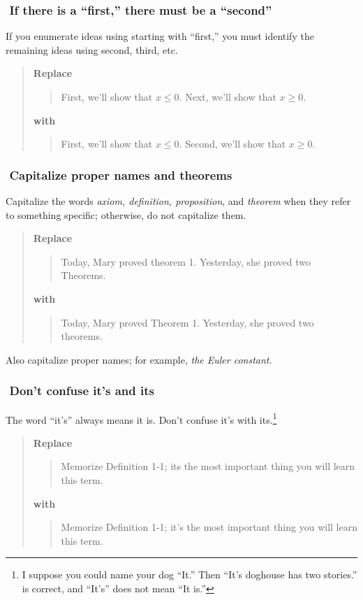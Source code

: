 \documentclass[12pt]{article}
\newcounter{ex}\setcounter{ex}{0}
\newcommand{\ex}{%
\hspace{-0.2in} \setcounter{ex}{\value{ex}+1}
\theex \,\,}
\newcounter{id}\setcounter{id}{0}
\newcounter{se}\setcounter{se}{0}
\begin{document}
\subsubsection*{\ex If there is a ``first,'' there must be a ``second''}

If you enumerate ideas using starting with ``first,'' you must identify
the remaining ideas using second, third, etc.

\begin{quote}
\textbf{\textbf{Replace}}
\begin{quote}
First, we'll show that \(x \leq 0\). Next, we'll show that
\(x \geq 0\).
\end{quote}
\textbf{with}
\begin{quote}
First, we'll show that \(x \leq 0\).  Second, we'll show that
\mbox{\(x \geq 0\)}.
\end{quote}
\end{quote}



\subsubsection*{\ex  Capitalize proper names and theorems}

Capitalize the words {\em axiom, definition, proposition\/}, and {\em theorem\/}
when they refer to something specific; otherwise, do not
capitalize them.

\begin{quote}
\textbf{\textbf{Replace}}
\begin{quote}
Today, Mary proved theorem 1. Yesterday, she proved two Theorems.
\end{quote}
\textbf{with}
\begin{quote}
Today, Mary proved Theorem 1. Yesterday, she proved two theorems.
\end{quote}
\end{quote}
Also capitalize proper names; for example, \emph{the Euler
constant}. 


\subsubsection*{\ex  Don't confuse it's and its}

The word ``it's'' always means it is. Don't confuse it's with its.\footnote{I suppose you
could name your dog ``It.'' Then ``It's doghouse has two stories.'' is correct,
and ``It's'' does not mean ``It is.''} 

\begin{quote}
\textbf{\textbf{Replace}}
\begin{quote}
Memorize Definition 1-1; its the most important thing you will learn
this term.
\end{quote}
\textbf{with}
\begin{quote}
Memorize Definition 1-1; it's the most important thing you will learn
this term.
\end{quote}
\end{quote}
\end{document}
